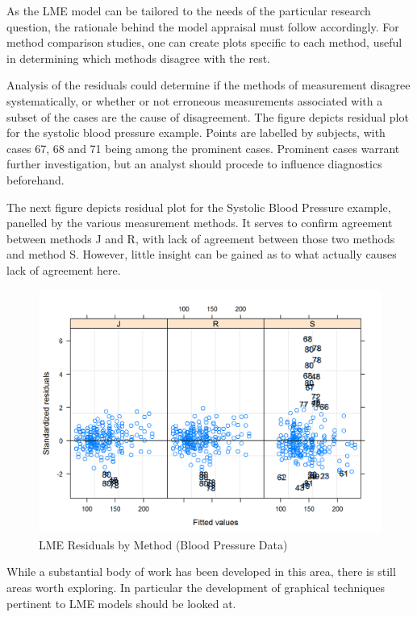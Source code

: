 \documentclass[12pt, a4paper]{report}
\theoremstyle{plain}
\theoremstyle{definition}
\theoremstyle{remark}
\begin{document}
As the LME model can be tailored to the needs of the particular research question, the rationale behind the model appraisal must follow accordingly. 
For method comparison studies, one can create plots specific to each method, useful in determining which methods disagree with the rest.
 	
%	
	
Analysis of the residuals could determine if the methods of measurement disagree systematically, or whether or not erroneous measurements associated with a subset of the cases are the cause of disagreement. The figure depicts residual plot for the systolic blood pressure example. Points are labelled by subjects, with cases 67, 68 and 71 being among the prominent cases. Prominent cases warrant further investigation, but an analyst should procede to influence diagnostics beforehand.
	
	
	The next figure depicts residual plot for the Systolic Blood Pressure example, panelled by the various measurement methods. It serves to confirm agreement between methods J and R, with lack of agreement between those two methods and method S. However, little insight can be gained as to what actually causes lack of agreement here. 
\begin{figure}[h!]
		\centering
		\includegraphics[width=0.8\linewidth]{images/bloodnlme-ResidPlot}
		\caption{LME Residuals by Method (Blood Pressure Data)}
\end{figure}
While a substantial body of work has been developed in this area, there is still areas worth exploring. 
	In particular the development of graphical techniques pertinent to LME models should be looked at.
	
\end{document}
